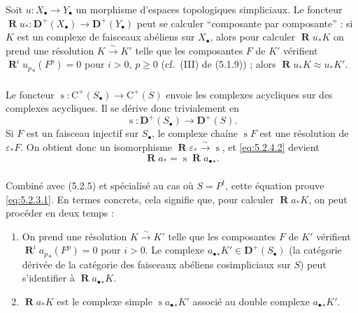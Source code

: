 \documentclass[11pt]{amsart}
\theoremstyle{plain}
\theoremstyle{definition}
\DeclareMathOperator{\Rd}{\mathbf{R}}
\DeclareMathOperator{\simp}{s}
\newcommand{\DD}{\mathbf{D}}
\newcommand{\Pt}{P^t}
\begin{document}
\subsubsection{}
Soit $u : X_\bullet \to Y_\bullet$ un morphisme d'espaces topologiques simpliciaux. Le foncteur $\Rd u_* : \DD^+(X_\bullet) \to \DD^+(Y_\bullet)$ peut se calculer ``composante par composante'' : si $K$ est un complexe de faisceaux ab\'eliens sur $X_\bullet$, alors pour calculer $\Rd u_* K$ on prend une r\'esolution $K \xrightarrow{\sim} K'$ telle que les composantes $F$ de $K'$ v\'erifient $\Rd^i {u_p}_*(F^p) = 0$ pour $i > 0$, $p \geq 0$ (cf.\ (III) de (5.1.9)) ; alors $\Rd u_* K \approx u_* K'$.

\subsubsection{}
Le foncteur $\simp : \mathrm{C}^+(S_\bullet) \to \mathrm{C}^+(S)$ envoie les complexes acycliques sur des complexes acycliques. Il se d\'erive donc trivialement en
\[
\simp : \DD^+(S_\bullet) \to \DD^+(S).
\]
Si $F$ est un faisceau injectif sur $S_\bullet$, le complexe cha\'ine $\simp F$ est une r\'esolution de $\varepsilon_* F$. On obtient donc un isomorphisme $\Rd \varepsilon_* \xrightarrow{\sim} \simp$, et \eqref{eq:5.2.4.2} devient
\begin{equation}\label{eq:5.2.6.1}
\Rd a_* = \simp \Rd {a_\bullet}_*.
\end{equation}

\subsubsection{}
Combin\'e avec (5.2.5) et sp\'ecialis\'e au cas o\`u $S = \Pt$, cette \'equation prouve \eqref{eq:5.2.3.1}. En termes concrets, cela signifie que, pour calculer $\Rd a_* K$, on peut proc\'eder en deux temps :
\begin{enumerate}
\item[(a)] On prend une r\'esolution $K \xrightarrow{\sim} K'$ telle que les composantes $F$ de $K'$ v\'erifient $\Rd^i {a_p}_*(F^p) = 0$ pour $i > 0$. Le complexe ${a_\bullet}_* K' \in \DD^+(S_\bullet)$ (la cat\'egorie d\'eriv\'ee de la cat\'egorie des faisceaux ab\'eliens cosimpliciaux sur $S$) peut s'identifier \`a $\Rd {a_\bullet}_* K$.
\item[(b)] $\Rd a_* K$ est le complexe simple $\simp {a_\bullet}_* K'$ associ\'e au double complexe ${a_\bullet}_* K'$.
\end{enumerate}
\end{document}
